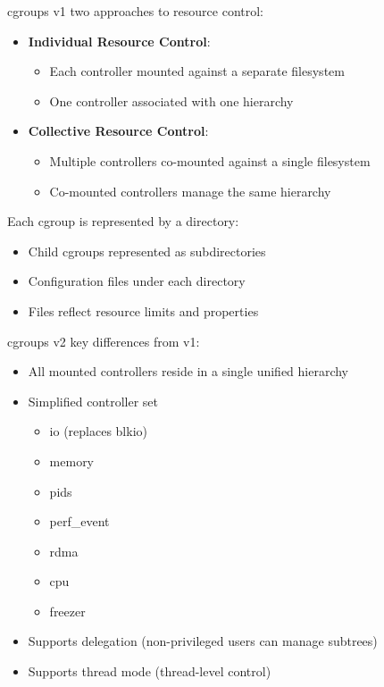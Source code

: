 \begin{definition}{cgroups v1} two approaches to resource control:
    \begin{itemize}
        \item \textbf{Individual Resource Control}:
            \begin{itemize}
                \item Each controller mounted against a separate filesystem
                \item One controller associated with one hierarchy
            \end{itemize}
        \item \textbf{Collective Resource Control}:
            \begin{itemize}
                \item Multiple controllers co-mounted against a single filesystem
                \item Co-mounted controllers manage the same hierarchy
            \end{itemize}
    \end{itemize}
    
    Each cgroup is represented by a directory:
    \begin{itemize}
        \item Child cgroups represented as subdirectories
        \item Configuration files under each directory
        \item Files reflect resource limits and properties
    \end{itemize}
\end{definition}

\begin{definition}{cgroups v2}
    key differences from v1:
    \begin{itemize}
        \item All mounted controllers reside in a single unified hierarchy
        \item Simplified controller set
            \begin{itemize}
                \item io (replaces blkio)
                \item memory
                \item pids
                \item perf\_event
                \item rdma
                \item cpu
                \item freezer
            \end{itemize}
        \item Supports delegation (non-privileged users can manage subtrees)
        \item Supports thread mode (thread-level control)
    \end{itemize}
\end{definition}

